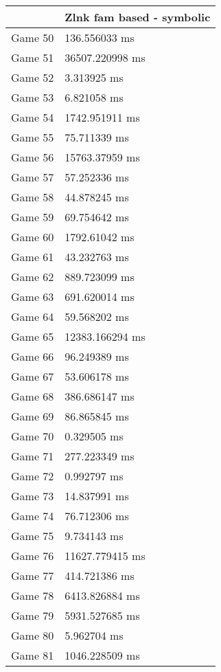 \begin{multicols}{2}
\begin{tabular}{|l|l|}
\end{tabular}\\
\begin{tabular}{|l|l|}
	\hline
	& Zlnk fam based - symbolic \\ \hline
	Game 50 & 136.556033 ms \\ \hline
	Game 51 & 36507.220998 ms \\ \hline
	Game 52 & 3.313925 ms \\ \hline
	Game 53 & 6.821058 ms \\ \hline
	Game 54 & 1742.951911 ms \\ \hline
	Game 55 & 75.711339 ms \\ \hline
	Game 56 & 15763.37959 ms \\ \hline
	Game 57 & 57.252336 ms \\ \hline
	Game 58 & 44.878245 ms \\ \hline
	Game 59 & 69.754642 ms \\ \hline
	Game 60 & 1792.61042 ms \\ \hline
	Game 61 & 43.232763 ms \\ \hline
	Game 62 & 889.723099 ms \\ \hline
	Game 63 & 691.620014 ms \\ \hline
	Game 64 & 59.568202 ms \\ \hline
	Game 65 & 12383.166294 ms \\ \hline
	Game 66 & 96.249389 ms \\ \hline
	Game 67 & 53.606178 ms \\ \hline
	Game 68 & 386.686147 ms \\ \hline
	Game 69 & 86.865845 ms \\ \hline
	Game 70 & 0.329505 ms \\ \hline
	Game 71 & 277.223349 ms \\ \hline
	Game 72 & 0.992797 ms \\ \hline
	Game 73 & 14.837991 ms \\ \hline
	Game 74 & 76.712306 ms \\ \hline
	Game 75 & 9.734143 ms \\ \hline
	Game 76 & 11627.779415 ms \\ \hline
	Game 77 & 414.721386 ms \\ \hline
	Game 78 & 6413.826884 ms \\ \hline
	Game 79 & 5931.527685 ms \\ \hline
	Game 80 & 5.962704 ms \\ \hline
	Game 81 & 1046.228509 ms \\ \hline

\end{tabular}
\end{multicols}
